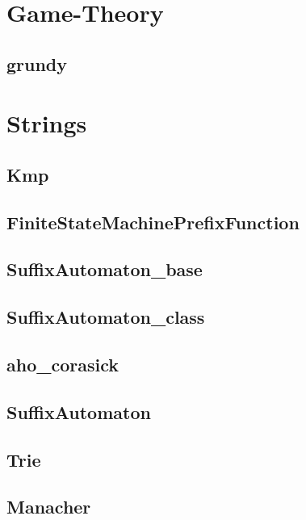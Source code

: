 \section{Game-Theory}
\subsection{grundy}
\raggedbottom
\hrulefill

\section{Strings}
\subsection{Kmp}
\raggedbottom
\hrulefill
\subsection{FiniteStateMachinePrefixFunction}
\raggedbottom
\hrulefill
\subsection{SuffixAutomaton_base}
\raggedbottom
\hrulefill
\subsection{SuffixAutomaton_class}
\raggedbottom
\hrulefill
\subsection{aho_corasick}
\raggedbottom
\hrulefill
\subsection{SuffixAutomaton}
\raggedbottom
\hrulefill
\subsection{Trie}
\raggedbottom
\hrulefill
\subsection{Manacher}
\raggedbottom
\hrulefill
